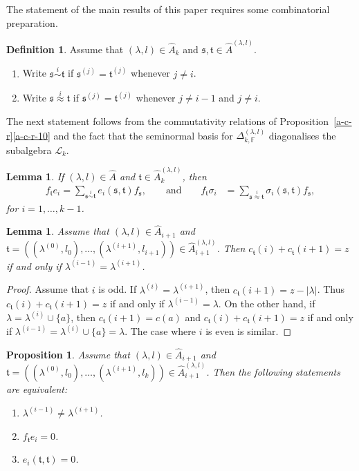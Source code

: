 \documentclass[11pt,a4paper,reqno,svgnames]{amsart}
\theoremstyle{plain}
\newtheorem{proposition}[theorem]{Proposition}
\newtheorem{lemma}[theorem]{Lemma}
\theoremstyle{definition}
\newtheorem{definition}[theorem]{Definition}
\numberwithin{equation}{section}
\begin{document}
The statement of the main results of this paper requires some combinatorial preparation.
\begin{definition}
Assume that $(\lambda,l)\in\hat{A}_k$ and $\mathfrak{s},\mathfrak{t}\in\hat{A}^{(\lambda,l)}$. 
\begin{enumerate}
 \item Write $\mathfrak{s}\stackrel{i}{\sim}\mathfrak{t}$ if $\mathfrak{s}^{(j)}=\mathfrak{t}^{(j)}$ whenever $j\ne i$. 
 \item Write $\mathfrak{s}\stackrel{i}{\approx}\mathfrak{t}$ if $\mathfrak{s}^{(j)}=\mathfrak{t}^{(j)}$ whenever $j\ne i-1$ and $j\ne i$. 
\end{enumerate}
\end{definition}
The next statement follows from the commutativity relations of Proposition~\ref{a-c-r}\eqref{a-c-r-10} and the fact that the seminormal basis for $\Delta_{k,\mathbb{F}}^{(\lambda,l)}$ diagonalises the subalgebra $\mathscr{L}_k$.
\begin{lemma}\label{similar}
If $(\lambda,l)\in\hat{A}$ and $\mathfrak{t}\in\hat{A}_k^{(\lambda,l)}$, then 
\begin{align*}
f_\mathfrak{t}e_{i}
=\sum_{\mathfrak{s}\stackrel{i}{\sim}\mathfrak{t}} e_{i}(\mathfrak{s},\mathfrak{t})f_\mathfrak{s},\qquad\text{and}\qquad f_\mathfrak{t}\sigma_{i}
&=\sum_{\mathfrak{s}\stackrel{i}{\approx}\mathfrak{t}} \sigma_{i}(\mathfrak{s},\mathfrak{t})f_\mathfrak{s},
\end{align*}
for $i=1,\ldots,k-1$. 
\end{lemma}
\begin{lemma}
Assume that $(\lambda,l)\in\hat{A}_{i+1}$ and $\mathfrak{t}= ((\lambda^{(0)},l_0),\ldots,(\lambda^{(i+1)},l_{i+1}))\in\hat{A}_{i+1}^{(\lambda,l)}$. Then $c_\mathfrak{t}(i)+c_\mathfrak{t}(i+1)=z$ if and only if $\lambda^{(i-1)}=\lambda^{(i+1)}$. 
\end{lemma}
\begin{proof}
Assume that $i$ is odd. If $\lambda^{(i)}=\lambda^{(i+1)}$, then $c_\mathfrak{t}(i+1)=z-|\lambda|$. Thus $c_\mathfrak{t}(i)+c_\mathfrak{t}(i+1)=z$ if and only if $\lambda^{(i-1)}=\lambda$. On the other hand, if $\lambda=\lambda^{(i)}\cup\lbrace a\rbrace$, then $c_\mathfrak{t}(i+1)=c(a)$ and $c_\mathfrak{t}(i)+c_\mathfrak{t}(i+1)=z$ if and only if $\lambda^{(i-1)}=\lambda^{(i)}\cup\lbrace a\rbrace=\lambda$.  The case where $i$ is even is similar.
\end{proof}
\begin{proposition}\label{nonzero}
Assume that $(\lambda,l)\in\hat{A}_{i+1}$ and $\mathfrak{t}= ((\lambda^{(0)},l_0),\ldots,(\lambda^{(i+1)},l_k))\in\hat{A}_{i+1}^{(\lambda,l)}$. Then the following statements are equivalent:
\begin{enumerate}
\item\label{firstz} $\lambda^{(i-1)}\ne \lambda^{(i+1)}$.
\item\label{secondz} $f_\mathfrak{t}e_i=0$.
\item\label{thirdz} $e_i(\mathfrak{t},\mathfrak{t})=0$. 
\end{enumerate}
\end{proposition}
\end{document}
